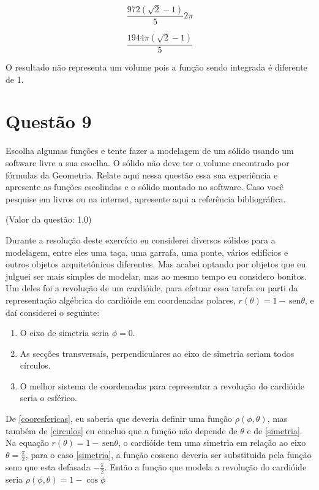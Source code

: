 \documentclass[10pt,a4paper]{article}
\newcommand{\sen}{\hspace{2pt}\textrm{sen}}
\begin{document}
	\begin{equation*}
		\frac{972(\sqrt{2} - 1)}{5} 2\pi
	\end{equation*}
	
	\begin{equation*}
		\frac{1944\pi(\sqrt{2} - 1)}{5}
	\end{equation*}
	
	O resultado não representa um volume pois a função sendo integrada é diferente de 1.
	
	\section*{Questão 9}
	
	Escolha algumas funções e tente fazer a modelagem de um sólido usando um software livre a sua esoclha. O sólido não deve ter o volume encontrado por fórmulas da Geometria. Relate aqui nessa questão essa sua experiência e apresente as funções escolindas e o sólido montado no software. Caso você pesquise em livros ou na internet, apresente aqui a referência bibliográfica.
	
	(Valor da questão: 1,0)
	
	Durante a resolução deste exercício eu considerei diversos sólidos para a modelagem, entre eles uma taça, uma garrafa, uma ponte, vários edifícios e outros objetos arquitetônicos diferentes. Mas acabei optando por objetos que eu julguei ser mais simples de modelar, mas ao mesmo tempo eu considero bonitos. Um deles foi a revolução de um cardióide, para efetuar essa tarefa eu parti da representação algébrica do cardióide em coordenadas polares, $ r(\theta) = 1 - \sen \theta $, e daí considerei o seguinte:
	\begin{enumerate}
		\item \label{simetria} O eixo de simetria seria $ \phi = 0 $.
		\item \label{circulos} As secções transversais, perpendiculares ao eixo de simetria seriam todos círculos.
		\item \label {cooresfericas}O melhor sistema de coordenadas para representar a revolução do cardióide seria o esférico.
	\end{enumerate}
	
	De \ref{cooresfericas}, eu saberia que deveria definir uma função $\rho(\phi, \theta)$, mas também de \ref{circulos} eu concluo que a função não depende de $\theta$ e de \ref{simetria}. Na equação $ r(\theta) = 1 - \sen \theta $, o cardióide tem uma simetria em relação ao eixo $\theta = \frac{\pi}{2}$, para o caso \ref{simetria}, a função cosseno deveria ser substituida pela função seno que esta defasada $-\frac{\pi}{2}$. Então a função que modela a revolução do cardióide seria $ \rho(\phi, \theta) = 1 - \cos \phi $
	
\end{document}
